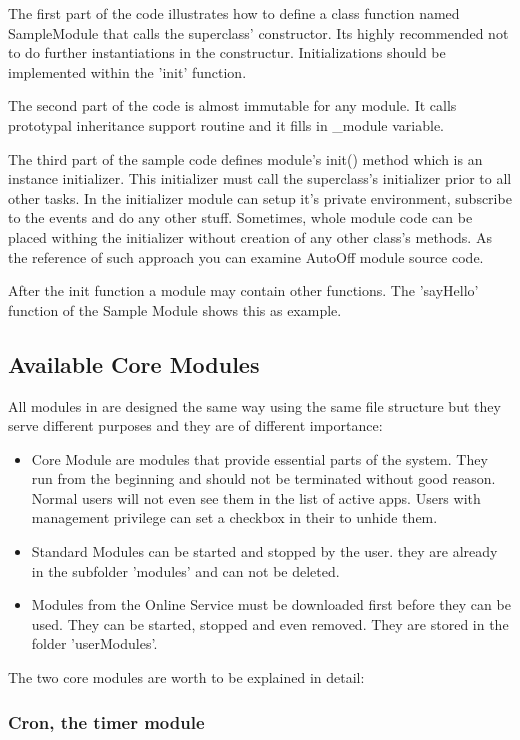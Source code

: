 The first part of the code illustrates how to define a class function named SampleModule 
that calls the superclass' constructor. Its highly recommended not to do further 
instantiations in the constructur. Initializations should be implemented within the 
'init' function.
 
The second part of the code is almost immutable for any module. It calls prototypal 
inheritance support routine and it fills in \_module variable.

The third part of the sample code defines module's init() method which is an 
instance initializer. This initializer must call the superclass's initializer prior to 
all other tasks. In the initializer module can setup it's private environment, subscribe 
to the events and do any other stuff.
Sometimes, whole module code can be placed withing the initializer without creation of 
any other class's methods. As the reference of such approach you can examine AutoOff 
module source code.

After the init function a module may contain other functions. The 'sayHello' function 
of the Sample Module shows this as example.

\subsection{Available Core Modules}

All modules in \zway are designed the same way using the same file structure but they 
serve different purposes and they are of different importance:
\begin{itemize}
\item Core Module are modules that provide essential parts of the \zway system. They run
from the beginning and should not be terminated without good reason. Normal users will
not even see them in the list of active apps. Users with management privilege can set a 
checkbox in their  to unhide them.
\item Standard Modules can be started and stopped by the user. they are already in the 
subfolder 'modules' and can not be deleted.
\item Modules from the Online Service must be downloaded first before they can be used. 
They can be started, stopped and even removed. They are stored in the folder 'userModules'.
\end{itemize}
The two core modules are worth to be explained in detail:

\subsubsection{Cron, the timer module}

